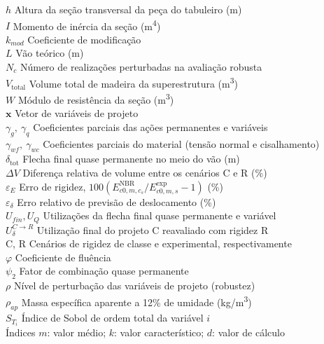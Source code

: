 \begin{tabbing}
$h$ \> Altura da seção transversal da peça do tabuleiro (m)\\
$I$ \> Momento de inércia da seção (m\textsuperscript{4})\\
$k_{mod}$ \> Coeficiente de modificação\\
$L$ \> Vão teórico (m)\\
$N_c$ \> Número de realizações perturbadas na avaliação robusta\\
$V_{\mathrm{total}}$ \> Volume total de madeira da superestrutura (m\textsuperscript{3})\\
$W$ \> Módulo de resistência da seção (m\textsuperscript{3})\\
$\mathbf{x}$ \> Vetor de variáveis de projeto\\
$\gamma_g,\ \gamma_q$ \> Coeficientes parciais das ações permanentes e variáveis\\
$\gamma_{wf},\ \gamma_{wc}$ \> Coeficientes parciais do material (tensão normal e cisalhamento)\\
$\delta_{\mathrm{tot}}$ \> Flecha final quase permanente no meio do vão (m)\\
$\Delta V$ \> Diferença relativa de volume entre os cenários C e R (\%)\\
$\varepsilon_E$ \> Erro de rigidez, $100(E_{c0,m,c_s}^{\mathrm{NBR}}/E_{c0,m,s}^{\mathrm{exp}}-1)$ (\%)\\
$\varepsilon_\delta$ \> Erro relativo de previsão de deslocamento (\%)\\
$U_{fin},U_Q$ \> Utilizações da flecha final quase permanente e variável\\
$U_\delta^{C\rightarrow R}$ \> Utilização final do projeto C reavaliado com rigidez R\\
C, R \> Cenários de rigidez de classe e experimental, respectivamente\\
$\varphi$ \> Coeficiente de fluência\\
$\psi_2$ \> Fator de combinação quase permanente\\
$\rho$ \> Nível de perturbação das variáveis de projeto (robustez)\\
$\rho_{ap}$ \> Massa específica aparente a 12\% de umidade (kg/m\textsuperscript{3})\\
$S_{T_i}$ \> Índice de Sobol de ordem total da variável $i$\\
Índices \> $m$: valor médio; $k$: valor característico; $d$: valor de cálculo
\end{tabbing}
